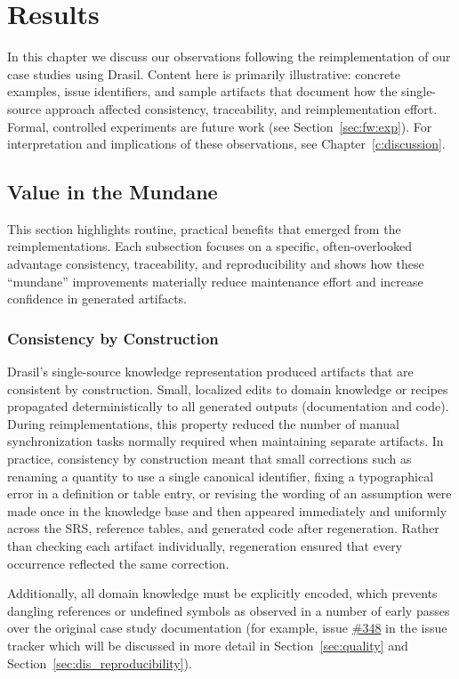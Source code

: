 \chapter{Results}
\label{c:results}

In this chapter we discuss our observations following the reimplementation 
of our case studies using Drasil. Content here is primarily illustrative: 
concrete examples, issue identifiers, and sample artifacts that document how the
single-source approach affected consistency, traceability, and
reimplementation effort. Formal, controlled experiments are future work
(see Section~\ref{sec:fw:exp}). For interpretation and implications of these
observations, see Chapter~\ref{c:discussion}.

\section{Value in the Mundane}

This section highlights routine, practical benefits that emerged from the
reimplementations. Each subsection focuses on a specific, often-overlooked
advantage \textemdash{} consistency, traceability, and reproducibility 
\textemdash{} and shows how these ``mundane'' improvements materially reduce
maintenance effort and increase confidence in generated artifacts.

\subsection{Consistency by Construction}
\label{sec:res_cons}
Drasil's single-source knowledge representation produced artifacts that are
consistent by construction. Small, localized edits to domain knowledge or
recipes propagated deterministically to all generated outputs (documentation
and code). During reimplementations, this property reduced the number of
manual synchronization tasks normally required when maintaining separate
artifacts. In practice, consistency by construction meant that small
corrections such as renaming a quantity to use a single canonical identifier,
fixing a typographical error in a definition or table entry, or revising the
wording of an assumption were made once in the knowledge base and then
appeared immediately and uniformly across the SRS, reference tables, and
generated code after regeneration. Rather than checking each artifact
individually, regeneration ensured that every occurrence reflected the same
correction.

Additionally, all domain knowledge must be explicitly encoded, which prevents
dangling references or undefined symbols as observed in a number of 
early passes over the original case study documentation (for example, issue 
\href{https://github.com/JacquesCarette/Drasil/issues/348}{\#348} in the issue 
tracker which will be discussed in more detail in Section~\ref{sec:quality} and 
Section~\ref{sec:dis_reproducibility}).

